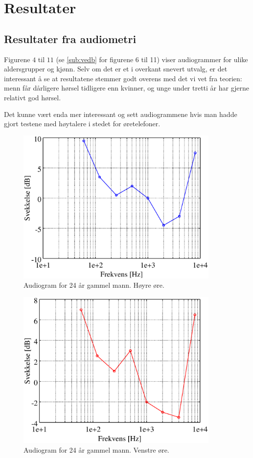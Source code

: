 \documentclass[norsk, twocolumn,letterpaper,11pt,fleqn]{extarticle}
\begin{document}
\section{Resultater}
\label{sec:res}
\subsection{Resultater fra audiometri}
\label{sub:resaud}
Figurene $4$ til $11$ (se \ref{sub:vedb} for figurene 6 til 11) viser audiogrammer for 
ulike aldersgrupper og kjønn.
Selv om det er et i overkant snevert utvalg, 
er det interessant å se at resultatene stemmer godt overens med det vi vet fra teorien:
menn får dårligere hørsel tidligere enn kvinner, og unge under tretti år
har gjerne relativt god hørsel.

Det kunne vært enda mer interessant og sett audiogrammene hvis man hadde gjort testene
med høytalere i stedet for øretelefoner.
\begin{figure}[h!]
	\centering
	\includegraphics[width=100mm]{rightear.eps}
	\caption[]{Audiogram for 24 år gammel mann. Høyre øre.}
	\label{fig:4}
\end{figure}
\begin{figure}[h!]
	\centering
	\includegraphics[width=100mm]{leftear.eps}
	\caption[]{Audiogram for 24 år gammel mann. Venstre øre.}
	\label{fig:5}
\end{figure}
\end{document}
